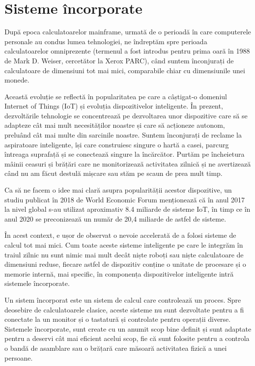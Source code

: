 \chapter{Sisteme încorporate}
\label{chapter:embed}

După epoca calculatoarelor mainframe, urmată de o perioadă în care computerele
personale au condus lumea tehnologiei, ne îndreptăm spre perioada
calculatoarelor omniprezente (termenul a fost introdus pentru prima oară în 1988
de Mark D. Weiser, cercetător la Xerox PARC), când suntem înconjurați de
calculatoare de dimensiuni tot mai mici, comparabile chiar cu dimensiunile unei
monede.

Această evoluție se reflectă în popularitatea pe care a câștigat-o domeniul
Internet of Things (IoT)  și evoluția
dispozitivelor inteligente. În prezent, dezvoltările tehnologie se concentrează
pe dezvoltarea unor dispozitive care să se adapteze cât mai mult necesităților
noastre și care să acționeze autonom, preluând cât mai multe din sarcinile
noastre. Suntem înconjurați de reclame la aspiratoare inteligente, își care
construiesc singure o hartă a casei, parcurg întreaga suprafață și se conectează
singure la încărcător. Purtăm pe încheietura mâinii ceasuri și brățări care ne
monitorizează activitatea zilnică și ne avertizează când nu am făcut destulă
mișcare sau stăm pe scaun de prea mult timp.

Ca să ne facem o idee mai clară asupra popularității acestor dispozitive, un
studiu publicat în 2018 de World Economic Forum menționează că în anul 2017 la
nivel global s-au utilizat aproximativ 8.4 miliarde de sisteme IoT, în timp ce
în anul 2020 se preconizează un număr de 20,4 miliarde de astfel de sisteme.

În acest context, e ușor de observat o nevoie accelerată de a folosi sisteme de
calcul tot mai mici. Cum toate aceste sisteme inteligente pe care le integrăm
în traiul zilnic nu sunt nimic mai mult decât niște roboți sau niște
calculatoare de dimensiuni reduse, fiecare astfel de dispozitiv conține o
unitate de procesare și o memorie internă, mai specific, în componența
dispozitivelor inteligente intră sistemele încorporate.

Un sistem încorporat este un sistem de calcul care controlează un proces. Spre
deosebire de calculatoarele clasice, aceste sisteme nu sunt dezvoltate pentru a
fi conectate la un monitor și o tastatură și controlate pentru operații diverse.
Sistemele încorporate, sunt create cu un anumit scop bine definit și sunt
adaptate pentru a deservi cât mai eficient acelui scop, fie că sunt folosite
pentru a controla o bandă de asamblare sau o brățară care măsoară activitatea
fizică a unei persoane.

